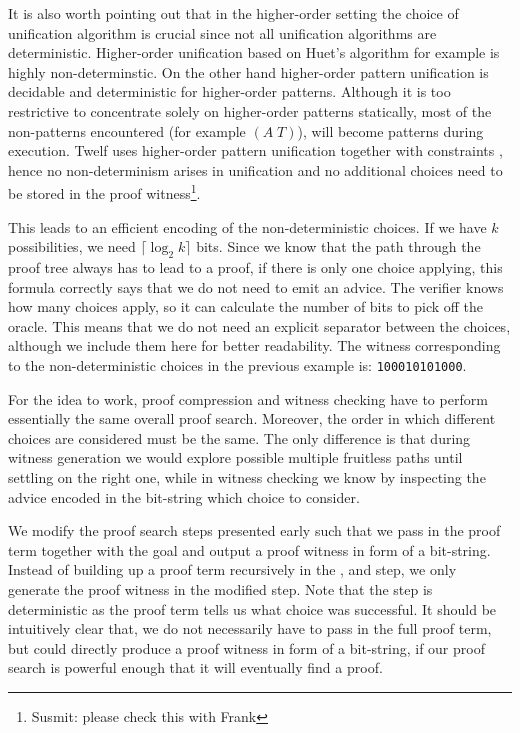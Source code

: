 \documentclass{acmconf}
\begin{document}
It is also worth pointing out that in the higher-order setting the
choice of unification algorithm is crucial since not all unification
algorithms are deterministic. Higher-order unification based on Huet's
algorithm \cite{Huet75} for example is highly non-determinstic. On the
other hand higher-order pattern unification \cite{Miller91jlc} is
decidable and deterministic for higher-order patterns. Although it is too restrictive to
concentrate solely on higher-order patterns statically, most of the
non-patterns encountered (for example $(A\;T)$), will become patterns
during execution. Twelf uses higher-order pattern unification together
with constraints \cite{Pfenning91lf}, hence no non-determinism arises
in unification and no additional choices need to be stored in the proof
witness\footnote{Susmit: please check this with Frank}. 

This leads to an efficient encoding of the non-deterministic
choices. If we have $k$ possibilities, we need $\lceil\log_2 k\rceil$
bits. Since we know that the path through the proof tree always has to
lead to a proof, if there is only one choice applying, this formula
correctly says that we do not need to emit an advice.  The verifier
knows how many choices apply, so it can calculate the number of bits
to pick off the oracle. This means that we do not need an explicit
separator between the choices, although we include them here for
better readability. The witness corresponding to the non-deterministic
choices in the previous example is: {\tt 100010101000}.

For the idea to work, proof compression and witness checking
have to perform essentially the same overall proof search. Moreover,
the order in which different choices are considered must be the same.
The only difference is that during witness generation we would explore
possible multiple fruitless paths until settling on the right one,
while in witness checking we know by inspecting the advice encoded in
the bit-string which choice to consider.

We modify the proof search steps presented early such that we pass in
the proof term together with the goal and output a proof witness in
form of a bit-string. Instead of building up a proof term recursively
in the {}, {} and {} step, we
only generate the proof witness in the modified {} step. 
Note that the {} step is deterministic as the proof term
tells us what choice was successful. It should be intuitively clear
that, we do not necessarily have to pass in the full proof term, but
could directly produce a proof witness in form of a bit-string, if our
proof search is powerful enough that it will eventually find a proof.
\end{document}
